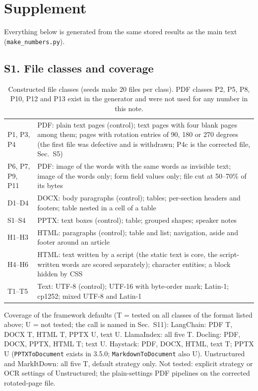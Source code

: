 \onecolumngrid\raggedbottom\small
\setcounter{table}{0}
\section*{Supplement}
Everything below is generated from the same stored results as the main text (\texttt{make\_numbers.py}).

\subsection*{S1. File classes and coverage}
\begin{table}[H]
\caption{Constructed file classes (seeds make 20 files per class). PDF classes P2, P5, P8, P10, P12 and P13 exist in the generator and were not used for any number in this note.\label{tab:classes}}
\begin{ruledtabular}
\begin{tabular}{lp{}}
P1, P3, P4 & PDF: plain text pages (control); text pages with four blank pages among them; pages with rotation entries of 90, 180 or 270 degrees (the first file was defective and is withdrawn; P4c is the corrected file, Sec.~S5) \\
P6, P7, P9, P11 & PDF: image of the words with the same words as invisible text; image of the words only; form field values only; file cut at 50--70\% of its bytes \\
D1--D4 & DOCX: body paragraphs (control); tables; per-section headers and footers; table nested in a cell of a table \\
S1--S4 & PPTX: text boxes (control); table; grouped shapes; speaker notes \\
H1--H3 & HTML: paragraphs (control); table and list; navigation, aside and footer around an article \\
H4--H6 & HTML: text written by a script (the static text is core, the script-written words are scored separately); character entities; a block hidden by CSS \\
T1--T5 & Text: UTF-8 (control); UTF-16 with byte-order mark; Latin-1; cp1252; mixed UTF-8 and Latin-1 \\
\end{tabular}
\end{ruledtabular}
\end{table}
Coverage of the framework defaults (T = tested on all classes of the format listed above; U = not tested; the call is named in Sec.~S11): LangChain: PDF T, DOCX T, HTML T, PPTX U, text U. LlamaIndex: all five T. Docling: PDF, DOCX, PPTX, HTML T; text U. Haystack: PDF, DOCX, HTML, text T; PPTX U (\texttt{PPTXToDocument} exists in 3.5.0; \texttt{MarkdownToDocument} also U). Unstructured and MarkItDown: all five T, default strategy only. Not tested: explicit strategy or OCR settings of Unstructured; the plain-settings PDF pipelines on the corrected rotated-page file.

